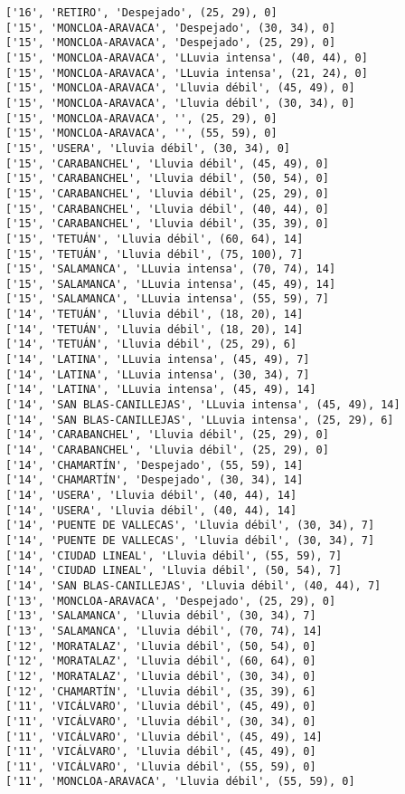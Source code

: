 \documentclass[11pt]{article}
\begin{document}
\begin{Verbatim}[commandchars=\\\{\}]
['16', 'RETIRO', 'Despejado', (25, 29), 0]
['15', 'MONCLOA-ARAVACA', 'Despejado', (30, 34), 0]
['15', 'MONCLOA-ARAVACA', 'Despejado', (25, 29), 0]
['15', 'MONCLOA-ARAVACA', 'LLuvia intensa', (40, 44), 0]
['15', 'MONCLOA-ARAVACA', 'LLuvia intensa', (21, 24), 0]
['15', 'MONCLOA-ARAVACA', 'Lluvia débil', (45, 49), 0]
['15', 'MONCLOA-ARAVACA', 'Lluvia débil', (30, 34), 0]
['15', 'MONCLOA-ARAVACA', '', (25, 29), 0]
['15', 'MONCLOA-ARAVACA', '', (55, 59), 0]
['15', 'USERA', 'Lluvia débil', (30, 34), 0]
['15', 'CARABANCHEL', 'Lluvia débil', (45, 49), 0]
['15', 'CARABANCHEL', 'Lluvia débil', (50, 54), 0]
['15', 'CARABANCHEL', 'Lluvia débil', (25, 29), 0]
['15', 'CARABANCHEL', 'Lluvia débil', (40, 44), 0]
['15', 'CARABANCHEL', 'Lluvia débil', (35, 39), 0]
['15', 'TETUÁN', 'Lluvia débil', (60, 64), 14]
['15', 'TETUÁN', 'Lluvia débil', (75, 100), 7]
['15', 'SALAMANCA', 'LLuvia intensa', (70, 74), 14]
['15', 'SALAMANCA', 'LLuvia intensa', (45, 49), 14]
['15', 'SALAMANCA', 'LLuvia intensa', (55, 59), 7]
['14', 'TETUÁN', 'Lluvia débil', (18, 20), 14]
['14', 'TETUÁN', 'Lluvia débil', (18, 20), 14]
['14', 'TETUÁN', 'Lluvia débil', (25, 29), 6]
['14', 'LATINA', 'LLuvia intensa', (45, 49), 7]
['14', 'LATINA', 'LLuvia intensa', (30, 34), 7]
['14', 'LATINA', 'LLuvia intensa', (45, 49), 14]
['14', 'SAN BLAS-CANILLEJAS', 'LLuvia intensa', (45, 49), 14]
['14', 'SAN BLAS-CANILLEJAS', 'LLuvia intensa', (25, 29), 6]
['14', 'CARABANCHEL', 'Lluvia débil', (25, 29), 0]
['14', 'CARABANCHEL', 'Lluvia débil', (25, 29), 0]
['14', 'CHAMARTÍN', 'Despejado', (55, 59), 14]
['14', 'CHAMARTÍN', 'Despejado', (30, 34), 14]
['14', 'USERA', 'Lluvia débil', (40, 44), 14]
['14', 'USERA', 'Lluvia débil', (40, 44), 14]
['14', 'PUENTE DE VALLECAS', 'Lluvia débil', (30, 34), 7]
['14', 'PUENTE DE VALLECAS', 'Lluvia débil', (30, 34), 7]
['14', 'CIUDAD LINEAL', 'Lluvia débil', (55, 59), 7]
['14', 'CIUDAD LINEAL', 'Lluvia débil', (50, 54), 7]
['14', 'SAN BLAS-CANILLEJAS', 'Lluvia débil', (40, 44), 7]
['13', 'MONCLOA-ARAVACA', 'Despejado', (25, 29), 0]
['13', 'SALAMANCA', 'Lluvia débil', (30, 34), 7]
['13', 'SALAMANCA', 'Lluvia débil', (70, 74), 14]
['12', 'MORATALAZ', 'Lluvia débil', (50, 54), 0]
['12', 'MORATALAZ', 'Lluvia débil', (60, 64), 0]
['12', 'MORATALAZ', 'Lluvia débil', (30, 34), 0]
['12', 'CHAMARTÍN', 'Lluvia débil', (35, 39), 6]
['11', 'VICÁLVARO', 'Lluvia débil', (45, 49), 0]
['11', 'VICÁLVARO', 'Lluvia débil', (30, 34), 0]
['11', 'VICÁLVARO', 'Lluvia débil', (45, 49), 14]
['11', 'VICÁLVARO', 'Lluvia débil', (45, 49), 0]
['11', 'VICÁLVARO', 'Lluvia débil', (55, 59), 0]
['11', 'MONCLOA-ARAVACA', 'Lluvia débil', (55, 59), 0]

\end{Verbatim}
\end{document}
